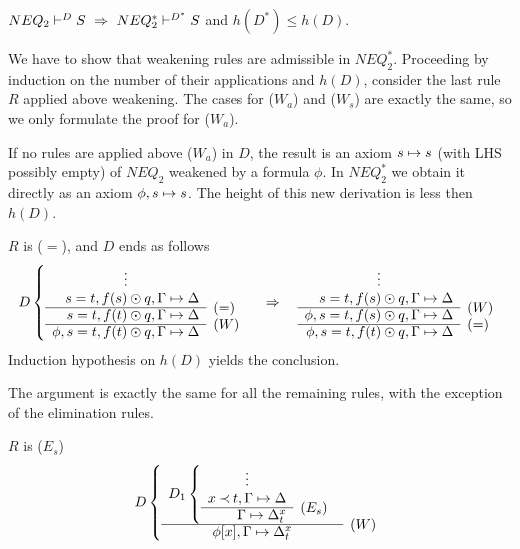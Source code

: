 \begin{LEMMA}\label{le:noweak}
 ${NEQ_2}\vdash^{{D}}S\ \mathrel\Rightarrow\ {NEQ_2^*}\vdash^{{D^*}}S$ and $h(D^*)\leq h(D)$.
\end{LEMMA}
\begin{PROOF}
We have to show that weakening rules are admissible in $NEQ_2^*$. Proceeding
by induction on the number of their applications and $h(D)$, consider the
last rule $R$ applied above weakening. The cases for ($W_a$) and ($W_s$) are
exactly the same, so we only formulate the proof for ($W_a$).
\begin{LS}
\item If no rules are applied above ($W_a$) in $D$, the result is an axiom
 $s\mathrel{\mapsto} s$ (with LHS possibly empty) of
 $NEQ_2$ weakened by a formula $\phi$. In $NEQ_2^*$ we obtain it directly as
 an axiom $\phi,s \mathrel{\mapsto} s$. The height of this new derivation is less then $h(D)$.
\item $R$ is ($=$), and $D$ ends as follows
\[ D \left \{ \begin{array}{rl}
 \multicolumn{1}{c}{\vdots} \\
 s=t, f(s)\odot q, \GSD \\ \cline{1-1}
 s=t, f(t)\odot q, \GSD & \rabove{(=)} \\ \cline{1-1}
 \phi, s=t, f(t)\odot q, \GSD & \rabove{(W)} \end{array} \right . \conv
 \begin{array}{rl}
 \multicolumn{1}{c}{\vdots} \\
 s=t, f(s)\odot q, \GSD \\ \cline{1-1}
 \phi, s=t, f(s)\odot q, \GSD & \rabove{(W)} \\ \cline{1-1}
 \phi, s=t, f(t)\odot q, \GSD & \rabove{(=)} \end{array} \]
Induction hypothesis on $h(D)$ yields the conclusion.
\item The argument is exactly the same for all the remaining rules, with the
exception of the elimination rules.
\item $R$ is ($E_s$)
\[ D \left \{ \begin{array}{cl}
 D_1 \left \{ \begin{array}{rl}
 \multicolumn{1}{c}{\vdots} \\
 x\Incl t,  \GSD \\ \cline{1-1}
  \GSD_t^x & \rabove{(E_s)} \end{array} \right . \\ \cline{1-1}
 \phi[x], \GSD_t^x & \rabove{(W)} \end{array} \right . \]

\end{LS}
\end{PROOF}
